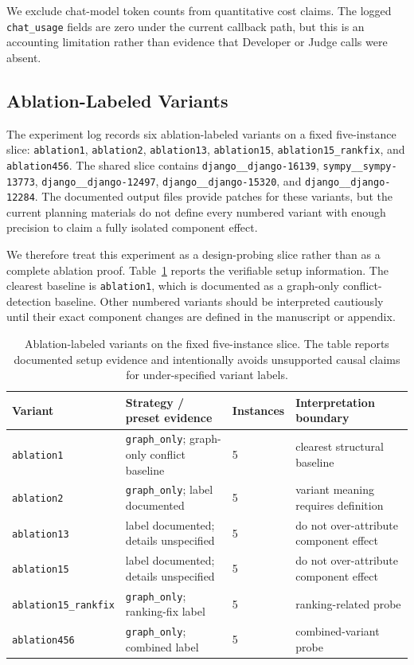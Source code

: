 \documentclass[11pt]{article}
\begin{document}
We exclude chat-model token counts from quantitative cost claims.  The logged \texttt{chat\_usage} fields are zero under the current callback path, but this is an accounting limitation rather than evidence that Developer or Judge calls were absent.

\subsection{Ablation-Labeled Variants}
\label{subsec:ablation-results}

The experiment log records six ablation-labeled variants on a fixed five-instance slice: \texttt{ablation1}, \texttt{ablation2}, \texttt{ablation13}, \texttt{ablation15}, \texttt{ablation15\_rankfix}, and \texttt{ablation456}.  The shared slice contains \texttt{django\_\_django-16139}, \texttt{sympy\_\_sympy-13773}, \texttt{django\_\_django-12497}, \texttt{django\_\_django-15320}, and \texttt{django\_\_django-12284}.  The documented output files provide patches for these variants, but the current planning materials do not define every numbered variant with enough precision to claim a fully isolated component effect.

We therefore treat this experiment as a design-probing slice rather than as a complete ablation proof.  Table~\ref{tab:ablation-variants} reports the verifiable setup information.  The clearest baseline is \texttt{ablation1}, which is documented as a graph-only conflict-detection baseline.  Other numbered variants should be interpreted cautiously until their exact component changes are defined in the manuscript or appendix.

\begin{table}[t]
\centering
\small
\begin{tabular}{llll}
\toprule
Variant & Strategy / preset evidence & Instances & Interpretation boundary \\
\midrule
\texttt{ablation1} & \texttt{graph\_only}; graph-only conflict baseline & 5 & clearest structural baseline \\
\texttt{ablation2} & \texttt{graph\_only}; label documented & 5 & variant meaning requires definition \\
\texttt{ablation13} & label documented; details unspecified & 5 & do not over-attribute component effect \\
\texttt{ablation15} & label documented; details unspecified & 5 & do not over-attribute component effect \\
\texttt{ablation15\_rankfix} & \texttt{graph\_only}; ranking-fix label & 5 & ranking-related probe \\
\texttt{ablation456} & \texttt{graph\_only}; combined label & 5 & combined-variant probe \\
\bottomrule
\end{tabular}
\caption{Ablation-labeled variants on the fixed five-instance slice.  The table reports documented setup evidence and intentionally avoids unsupported causal claims for under-specified variant labels.}
\label{tab:ablation-variants}
\end{table}
\end{document}
